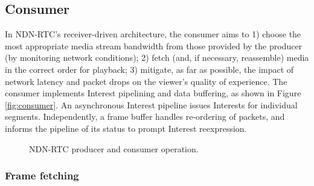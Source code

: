 \documentclass{icn/sig-alternate-2013} %
\newcommand{\ndnrtcName}{NDN-RTC} %
\begin{document}
\subsection{Consumer}
\label{sec:consumer}

In \ndnrtcName{}'s receiver-driven architecture, the consumer aims to 1) choose the most appropriate media stream bandwidth from those provided by the producer (by monitoring network conditions); 2) fetch (and, if necessary, reassemble) media in the correct order for playback; 3) mitigate, as far as possible, the impact of network latency and packet drops on the viewer's quality of experience.  
The consumer implements Interest pipelining and data buffering, as shown in Figure \ref{fig:consumer}. An asynchronous Interest pipeline issues Interests for individual segments. Independently, a frame buffer handles re-ordering of packets, and informs the pipeline of its status to prompt Interest reexpression.

\begin{figure}[t!]
\centering
{}\qquad
{}
\caption{\ndnrtcName{} producer and consumer operation.}
\end{figure}

\subsubsection{Frame fetching}
\end{document}
